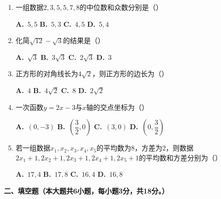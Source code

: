 \documentclass[12pt, a4paper]{ctexart}
\begin{document}
\begin{enumerate}[label=\arabic*.]
\item 一组数据$2,3,5,5,7,8$的中位数和众数分别是（\hspace{1cm}）
\begin{enumerate}[label=\Alph*.]
\quad \textbf{A.}~$5,5$ \quad \textbf{B.}~$5,3$ \quad \textbf{C.}~$4,5$ \quad \textbf{D.}~$5,4$
\end{enumerate}

\item 化简$\sqrt{12}-\sqrt{3}$的结果是（\hspace{1cm}）
\begin{enumerate}[label=\Alph*.]
\quad \textbf{A.}~$\sqrt{3}$ \quad \textbf{B.}~$3\sqrt{3}$ \quad \textbf{C.}~$2\sqrt{3}$ \quad \textbf{D.}~$3$
\end{enumerate}

\item 正方形的对角线长为$4\sqrt{2}$，则正方形的边长为（\hspace{1cm}）
\begin{enumerate}[label=\Alph*.]
\quad \textbf{A.}~$4$ \quad \textbf{B.}~$4\sqrt{2}$ \quad \textbf{C.}~$8$ \quad \textbf{D.}~$2\sqrt{2}$
\end{enumerate}

\item 一次函数$y=2x-3$与$x$轴的交点坐标为（\hspace{1cm}）
\begin{enumerate}[label=\Alph*.]
\quad \textbf{A.}~$(0,-3)$ \quad \textbf{B.}~$\left(\dfrac{3}{2},0\right)$ \quad \textbf{C.}~$(3,0)$ \quad \textbf{D.}~$\left(0,\dfrac{3}{2}\right)$
\end{enumerate}

\item 若一组数据$x_{1},x_{2},x_{3},x_{4},x_{5}$的平均数为$8$，方差为$2$，则数据$2x_{1}+1,2x_{2}+1,2x_{3}+1,2x_{4}+1,2x_{5}+1$的平均数和方差分别为（\hspace{1cm}）
\begin{enumerate}[label=\Alph*.]
\quad \textbf{A.}~$17,4$ \quad \textbf{B.}~$17,8$ \quad \textbf{C.}~$16,4$ \quad \textbf{D.}~$16,8$
\end{enumerate}

\end{enumerate}

\vspace{0.5cm}

{\large\bfseries 二、填空题（本大题共6小题，每小题3分，共18分。）}
\end{document}
